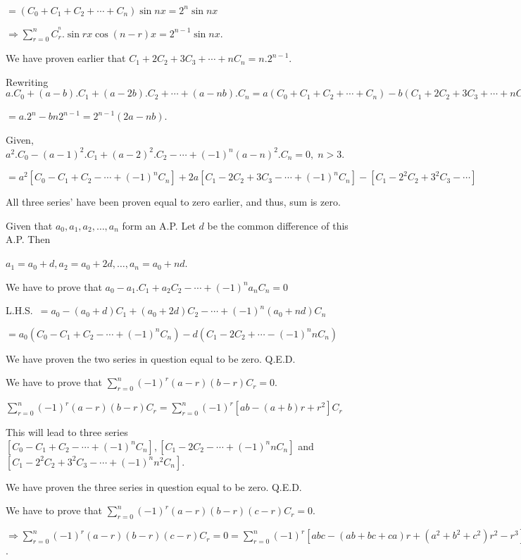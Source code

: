   $=(C_0 + C_1 + C_2 + \cdots + C_n)\sin nx = 2^n\sin nx$

  $\Rightarrow \displaystyle\sum_{r=0}^nC_r^^n.\sin rx\cos(n - r)x = 2^{n- 1}\sin nx$.
\item We have proven earlier that $C_1 + 2C_2 + 3C_3 + \cdots + nC_n = n.2^{n - 1}$.

  Rewriting $a.C_0 + (a - b).C_1 + (a - 2b).C_2 + \cdots + (a - nb).C_n = a(C_0 + C_1 + C_2 + \cdots + C_n)
  - b(C_1 + 2C_2 + 3C_3 + \cdots + nC_n)$

  $= a.2^n - bn2^{n - 1} = 2^{n - 1}(2a - nb)$.
\item Given, $a^2.C_0 - (a - 1)^2.C_1 + (a - 2)^2.C_2 - \cdots + (-1)^n(a - n)^2.C_n = 0,\;n>3$.

  $= a^2[C_0 - C_1 + C_2 - \cdots + (-1)^nC_n] + 2a[C_1 - 2C_2 + 3C_3 - \cdots + (-1)^nC_n] - [C_1 - 2^2C_2
  + 3^2C_3 - \cdots]$

  All three series' have been proven equal to zero earlier, and thus, sum is zero.
\item Given that $a_0, a_1, a_2, \ldots, a_n$ form an A.P. Let $d$ be the common difference of this
  A.P. Then

  $a_1 = a_0 + d, a_2 = a_0 + 2d, \ldots, a_n = a_0 + nd$.

  We have to prove that $a_0 - a_1.C_1 + a_2C_2 - \cdots + (-1)^na_nC_n = 0$

  L.H.S.\ $= a_0 - (a_0 + d)C_1 + (a_0 + 2d)C_2 - \cdots + (-1)^n(a_0 + nd)C_n$

  $= a_0(C_0 - C_1 + C_2 - \cdots + (-1)^nC_n) - d(C_1 - 2C_2 + \cdots - (-1)^nnC_n)$

  We have proven the two series in question equal to be zero. Q.E.D.
\item We have to prove that $\displaystyle\sum_{r=0}^n(-1)^r(a - r)(b - r)C_r = 0$.

  $\displaystyle\sum_{r=0}^n(-1)^r(a - r)(b - r)C_r = \sum_{r = 0}^n(-1)^r[ab - (a + b)r + r^2]C_r$

  This will lead to three series $[C_0 - C_1 + C_2 - \cdots + (-1)^nC_n], [C_1 - 2C_2 - \cdots +
    (-1)^nnC_n]$ and $[C_1 - 2^2C_2 + 3^2C_3 - \cdots + (-1)^nn^2C_n]$.

  We have proven the three series in question equal to be zero. Q.E.D.
\item We have to prove that $\displaystyle\sum_{r=0}^n(-1)^r(a - r)(b - r)(c - r)C_r = 0$.

  $\Rightarrow \displaystyle\sum_{r=0}^n(-1)^r(a - r)(b - r)(c - r)C_r = 0 = \sum_{r = 0}^n(-1)^r[abc -(ab +
  bc + ca)r + (a^2 + b^2 + c^2)r^2 - r^3]C_r = 0$.


